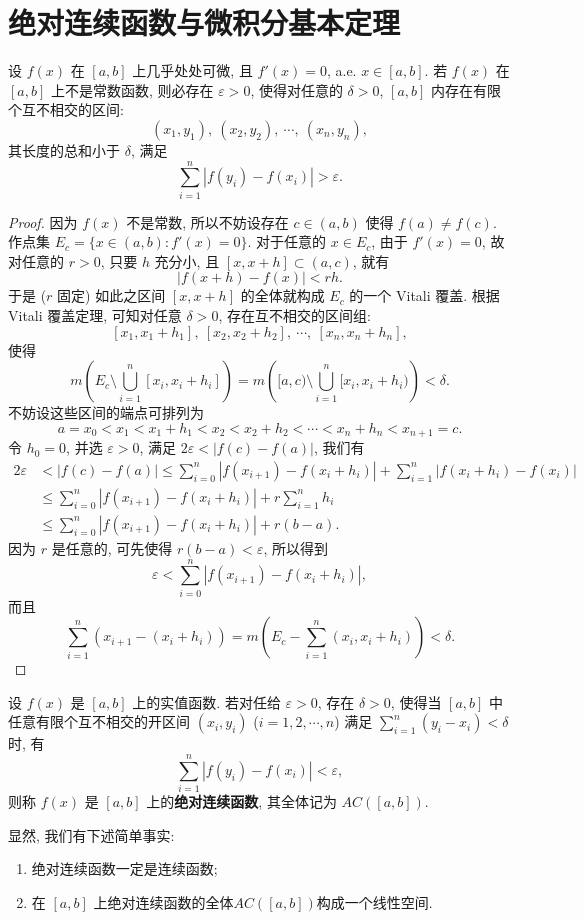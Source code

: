 \documentclass[../../main.tex]{subfiles}%
\begin{document}
\section{绝对连续函数与微积分基本定理}

\begin{lemma}\label{lemma:实变函数--引理5.9}
设 $f(x)$ 在 $[a,b]$ 上几乎处处可微, 且 $f'(x)=0$, a.e. $x\in[a,b]$. 若 $f(x)$ 在 $[a,b]$ 上不是常数函数, 则必存在 $\varepsilon>0$, 使得对任意的 $\delta>0$, $[a,b]$ 内存在有限个互不相交的区间:
\[
(x_1,y_1),\ (x_2,y_2),\ \cdots,\ (x_n,y_n),
\]
其长度的总和小于 $\delta$, 满足
\[
\sum_{i=1}^n |f(y_i)-f(x_i)|>\varepsilon.
\]
\end{lemma}

\begin{proof}
因为 $f(x)$ 不是常数, 所以不妨设存在 $c\in(a,b)$ 使得 $f(a)\neq f(c)$. 作点集 $E_c = \{x\in(a,b): f'(x)=0\}$. 对于任意的 $x\in E_c$, 由于 $f'(x)=0$, 故对任意的 $r>0$, 只要 $h$ 充分小, 且 $[x,x+h]\subset(a,c)$, 就有
\[
|f(x+h)-f(x)| < rh.
\]
于是 ($r$ 固定) 如此之区间 $[x,x+h]$ 的全体就构成 $E_c$ 的一个 Vitali 覆盖. 根据 Vitali 覆盖定理, 可知对任意 $\delta>0$, 存在互不相交的区间组:
\[
[x_1,x_1+h_1],\ [x_2,x_2+h_2],\ \cdots,\ [x_n,x_n+h_n],
\]
使得
\[
m\left(E_c\setminus\bigcup_{i=1}^n [x_i,x_i+h_i]\right) = m\left([a,c)\setminus\bigcup_{i=1}^n [x_i,x_i+h_i)\right) < \delta.
\]
不妨设这些区间的端点可排列为
\[
a = x_0 < x_1 < x_1+h_1 < x_2 < x_2+h_2 < \cdots < x_n+h_n < x_{n+1} = c.
\]
令 $h_0=0$, 并选 $\varepsilon>0$, 满足 $2\varepsilon < |f(c)-f(a)|$, 我们有
\begin{align*}
2\varepsilon &< |f(c)-f(a)| 
\leqslant \sum_{i=0}^n |f(x_{i+1})-f(x_i+h_i)| + \sum_{i=1}^n |f(x_i+h_i)-f(x_i)| \\
&\leqslant \sum_{i=0}^n |f(x_{i+1})-f(x_i+h_i)| + r\sum_{i=1}^n h_i \\
&\leqslant \sum_{i=0}^n |f(x_{i+1})-f(x_i+h_i)| + r(b-a).
\end{align*}
因为 $r$ 是任意的, 可先使得 $r(b-a)<\varepsilon$, 所以得到
\[
\varepsilon < \sum_{i=0}^n |f(x_{i+1})-f(x_i+h_i)|,
\]
而且
\[
\sum_{i=1}^n (x_{i+1}-(x_i+h_i)) = m\left(E_c - \sum_{i=1}^n (x_i,x_i+h_i)\right) < \delta.
\]
\end{proof}

\begin{definition}[绝对连续函数]\label{definecolor:绝对连续函数的定义}
设 $f(x)$ 是 $[a,b]$ 上的实值函数. 若对任给 $\varepsilon>0$, 存在 $\delta>0$, 使得当 $[a,b]$ 中任意有限个互不相交的开区间 $(x_i,y_i)$ ($i=1,2,\cdots,n$) 满足 $\sum_{i=1}^n (y_i-x_i) < \delta$ 时, 有
\[
\sum_{i=1}^n |f(y_i)-f(x_i)| < \varepsilon,
\]
则称 $f(x)$ 是 $[a,b]$ 上的\textbf{绝对连续函数}, 其全体记为 $AC([a,b])$.
\end{definition}
\begin{remark}
显然, 我们有下述简单事实:
\begin{enumerate}[(1)]
\item 绝对连续函数一定是连续函数;

\item 在 $[a,b]$ 上绝对连续函数的全体$AC([a,b])$构成一个线性空间.
\end{enumerate}
\end{remark}
\end{document}
